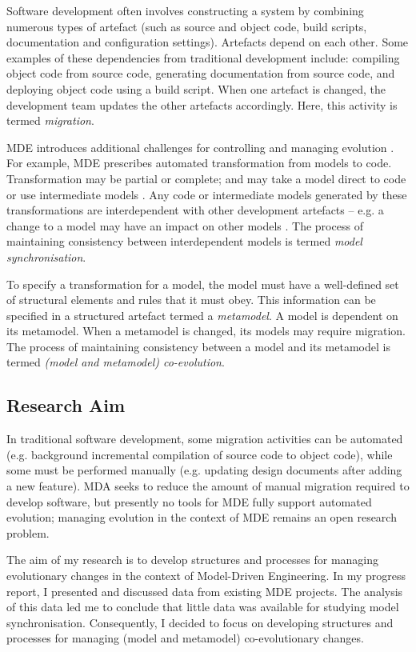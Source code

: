 Software development often involves constructing a system by combining numerous types of artefact (such as source and object code, build scripts, documentation and configuration settings). Artefacts depend on each other. Some examples of these dependencies from traditional development include: compiling object code from source code, generating documentation from source code, and deploying object code using a build script. When one artefact is changed, the development team updates the other artefacts accordingly. Here, this activity is termed \textit{migration}.

MDE introduces additional challenges for controlling and managing evolution \cite{Mens07}. For example, MDE prescribes automated transformation from models to code. Transformation may be partial or complete; and may take a model direct to code or use intermediate models \cite{kleppe03mda}. Any code or intermediate models generated by these transformations are interdependent with other development artefacts -- e.g. a change to a model may have an impact on other models \cite{deursen07mdse}. The process of maintaining consistency between interdependent models is termed \textit{model synchronisation}.

To specify a transformation for a model, the model must have a well-defined set of structural elements and rules that it must obey. This information can be specified in a structured artefact termed a \emph{metamodel}. A model is dependent on its metamodel. When a metamodel is changed, its models may require migration. The process of maintaining consistency between a model and its metamodel is termed \textit{(model and metamodel) co-evolution}.

\subsection{Research Aim}
In traditional software development, some migration activities can be automated (e.g. background incremental compilation of source code to object code), while some must be performed manually (e.g. updating design documents after adding a new feature). MDA seeks to reduce the amount of manual migration required to develop software, but presently no tools for MDE fully support automated evolution; managing evolution in the context of MDE remains an open research problem.

The aim of my research is to develop structures and processes for managing evolutionary changes in the context of Model-Driven Engineering. In my progress report, I presented and discussed data from existing MDE projects. The analysis of this data led me to conclude that little data was available for studying model synchronisation. Consequently, I decided to focus on developing structures and processes for managing (model and metamodel) co-evolutionary changes.